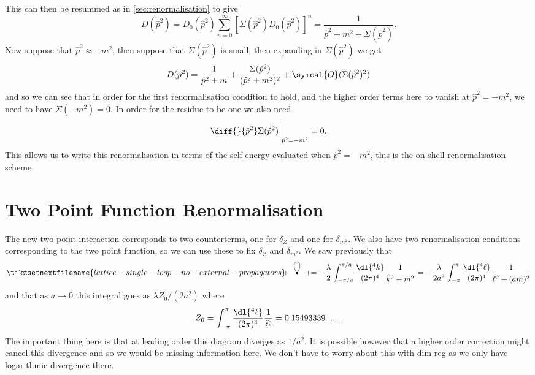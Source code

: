\documentclass[fleqn]{NotesClass}
\newcommand{\order}{\symcal{O}}
\begin{document}
    This can then be resummed as in \cref{sec:renormalisation} to give
    \begin{equation}
        D(\hat{p}^2) = D_0(\hat{p}^2) \sum_{n=0}^{\infty} [\Sigma(\hat{p}^2) D_0(\hat{p}^2)]^n = \frac{1}{\hat{p}^2 + m^2 - \Sigma(\hat{p}^2)}.
    \end{equation}
    Now suppose that \(\hat{p}^2 \approx -m^2\), then suppose that \(\Sigma(\hat{p}^2)\) is small, then expanding in \(\Sigma(\hat{p}^2)\) we get
    \begin{equation}
        D(\hat{p}^2) = \frac{1}{\hat{p}^2 + m} + \frac{\Sigma(\hat{p}^2)}{(\hat{p}^2 + m^2)^2} + \order(\Sigma(\hat{p}^2)^2)
    \end{equation}
    and so we can see that in order for the first renormalisation condition to hold, and the higher order terms here to vanish at \(\hat{p}^2 = -m^2\), we need to have \(\Sigma(-m^2) = 0\).
    In order for the residue to be one we also need
    \begin{equation}
        \diff{}{\hat{p}^2} \Sigma(\hat{p}^2) \bigg|_{\hat{p}^2 = -m^2} = 0.
    \end{equation}
    This allows us to write this renormalisation in terms of the self energy evaluated when \(\hat{p}^2 = -m^2\), this is the on-shell renormalisation scheme.
    
    \section{Two Point Function Renormalisation}
    The new two point interaction corresponds to two counterterms, one for \(\delta_Z\) and one for \(\delta_{m^2}\).
    We also have two renormalisation conditions corresponding to the two point function, so we can use these to fix \(\delta_Z\) and \(\delta_{m^2}\).
    We saw previously that
    \begin{equation}
        \tikzsetnextfilename{lattice-single-loop-no-external-propagators}
        \begin{tikzpicture}[baseline=-2.5pt]
            \draw (0, 0) -- (1, 0);
            \fill (0.5, 0) circle [radius=0.05];
            \draw (0.5, 0) to [out=45, in=0] (0.5, 0.5);
            \draw (0.5, 0) to [out=135, in=180] (0.5, 0.5);
            \draw (0, -0.1) -- (0, 0.1);
            \draw (1, -0.1) -- (1, 0.1);
        \end{tikzpicture}
        = -\frac{\lambda}{2} \int_{-\pi/a}^{\pi/a} \frac{\dl{^4k}}{(2\pi)^4} \frac{1}{\hat{k}^2 + m^2} = - \frac{\lambda}{2a^2} \int_{-\pi}^{\pi} \frac{\dl{^4\ell}}{(2\pi)^4} \frac{1}{\hat{\ell}^2 + (am)^2}
    \end{equation}
    and that as \(a \to 0\) this integral goes as \(\lambda Z_0/(2a^2)\) where
    \begin{equation}
        Z_0 = \int_{-\pi}^{\pi} \frac{\dl{^4\ell}}{(2\pi)^4} \frac{1}{\hat{\ell}^2} = 0.15493339\dotso.
    \end{equation}
    The important thing here is that at leading order this diagram diverges as \(1/a^2\).
    It is possible however that a higher order correction might cancel this divergence and so we would be missing information here.
    We don't have to worry about this with dim reg as we only have logarithmic divergence there.
    
\end{document}
